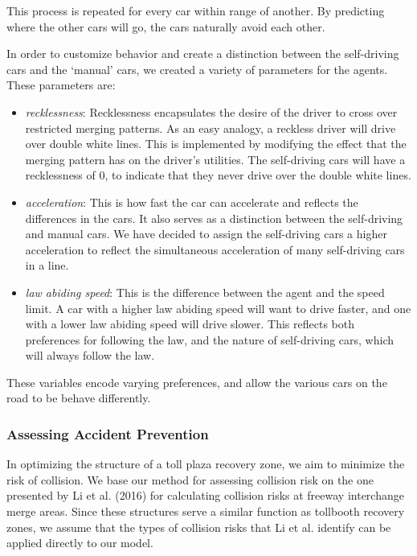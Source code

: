 \documentclass[a4paper, 11pt]{article}
\begin{document}
This process is repeated for every car within range of another. By predicting where the other cars will go, the cars naturally avoid each other.%

In order to customize behavior and create a distinction between the self-driving cars and the `manual' cars, we created a variety of parameters for the agents. These parameters are:

\begin{itemize}
\item \textit{recklessness}: Recklessness encapsulates the desire of the driver to cross over restricted merging patterns. As an easy analogy, a reckless driver will drive over double white lines. This is implemented by modifying the effect that the merging pattern has on the driver's utilities. The self-driving cars will have a recklessness of 0, to indicate that they never drive over the double white lines. 
\item \textit{acceleration}: This is how fast the car can accelerate and reflects the differences in the cars. It also serves as a distinction between the self-driving and manual cars. We have decided to assign the self-driving cars a higher acceleration to reflect the simultaneous acceleration of many self-driving cars in a line. 
\item \textit{law abiding speed}: This is the difference between the agent and the speed limit. A car with a higher law abiding speed will want to drive faster, and one with a lower law abiding speed will drive slower. This reflects both preferences for following the law, and the nature of self-driving cars, which will always follow the law. 
\end{itemize}

These variables encode varying preferences, and allow the various cars on the road to be behave differently. 

\subsubsection{Assessing Accident Prevention}
\label{collision_risk}



In optimizing the structure of a toll plaza recovery zone, we aim to minimize the risk of collision. We base our method for assessing collision risk on the one presented by Li et al. (2016) for calculating collision risks at freeway interchange merge areas. Since these structures serve a similar function as tollbooth recovery zones, we assume that the types of collision risks that Li et al. identify can be applied directly to our model. 
\end{document}
